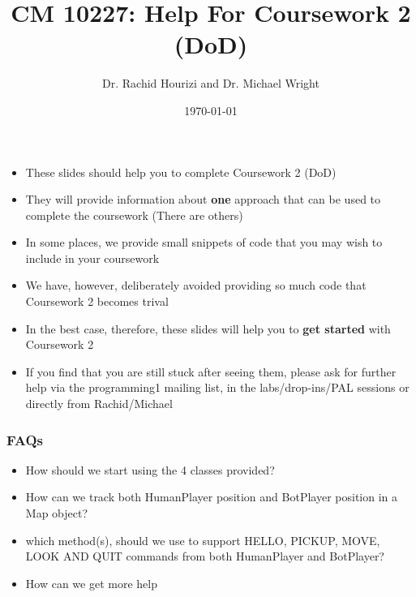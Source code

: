 \documentclass{beamer}
\begin{document}

\title{CM 10227: Help For Coursework 2 (DoD)}
\author{Dr. Rachid Hourizi and Dr. Michael Wright}
\date{\today}
\frame{\titlepage}

\begin{frame}
\begin{itemize}
\item These slides should help you to complete Coursework 2 (DoD)
\item They will provide information about \textbf{one} approach that can be used to complete the coursework (There are others)
\end{itemize}
\end{frame}

\begin{frame}
\begin{itemize}
\item In some places, we provide small snippets of code that you may wish to include in your coursework 
\item We have, however, deliberately avoided providing so much code that Coursework 2 becomes trival
\end{itemize}
\end{frame}

\begin{frame}
\begin{itemize}
\item In the best case, therefore, these slides will help you to \textbf{get started} with Coursework 2 
\item If you find that you are still stuck after seeing them, please ask for further help via the programming1 mailing list, in the labs/drop-ins/PAL sessions or directly from Rachid/Michael
\end{itemize}
\end{frame}

\begin{frame}
\frametitle{FAQs}
\begin{itemize}
\item How should we start using the 4 classes provided?
\item How can we track both HumanPlayer position and BotPlayer position in a Map object?
\item which method(s), should we use to support HELLO, PICKUP, MOVE, LOOK AND QUIT commands from both HumanPlayer and BotPlayer?
\item How can we get more help
\end{itemize}
\end{frame}
\end{document}
